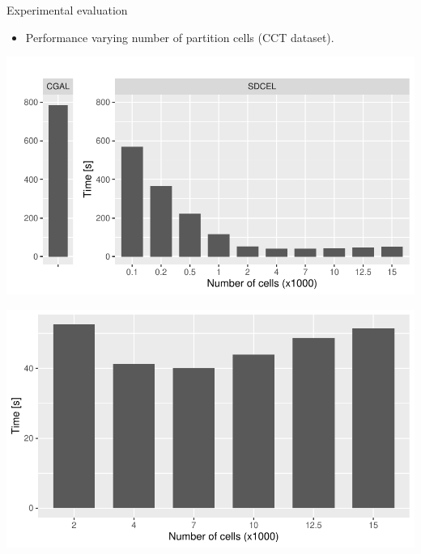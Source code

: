 \documentclass{beamer}
\begin{document}
    \begin{frame}{Experimental evaluation}
        \begin{itemize}
            \item Performance varying number of partition cells (CCT dataset).
        \end{itemize}
        \vspace{1cm}
    
        \begin{minipage}{0.49\textwidth}
            \centering
            \includegraphics[width=\textwidth]{figures/ca}
        \end{minipage}\hfill %
        \begin{minipage}{0.49\textwidth}
            \centering
            \includegraphics[width=\textwidth]{figures/ca_sample}
        \end{minipage}
    \end{frame}    
\end{document}
